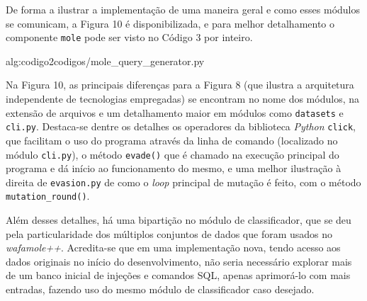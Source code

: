 De forma a ilustrar a implementação de uma maneira geral e como esses módulos se comunicam, a Figura 10 é disponibilizada, e para melhor detalhamento o componente \verb+mole+ pode ser visto no Código 3 por inteiro.

\label{sec:codigos}
 {alg:codigo2}{codigos/mole_query_generator.py}
\bigskip

Na Figura 10, as principais diferenças para a Figura 8 (que ilustra a arquitetura independente de tecnologias empregadas) se encontram no nome dos módulos, na extensão de arquivos e um detalhamento maior em módulos como \verb+datasets+ e \verb+cli.py+. Destaca-se dentre os detalhes os operadores da biblioteca \textit{Python} \verb+click+, que facilitam o uso do programa através da linha de comando (localizado no módulo \verb+cli.py+), o método \verb+evade()+ que é chamado na execução principal do programa e dá início ao funcionamento do mesmo, e uma melhor ilustração à direita de \verb+evasion.py+ de como o \textit{loop} principal de mutação é feito, com o método \verb+mutation_round()+.

Além desses detalhes, há uma bipartição no módulo de classificador, que se deu pela particularidade dos múltiplos conjuntos de dados que foram usados no \textit{wafamole++}. Acredita-se que em uma implementação nova, tendo acesso aos dados originais no início do desenvolvimento, não seria necessário explorar mais de um banco inicial de injeções e comandos SQL, apenas aprimorá-lo com mais entradas, fazendo uso do mesmo módulo de classificador caso desejado.

